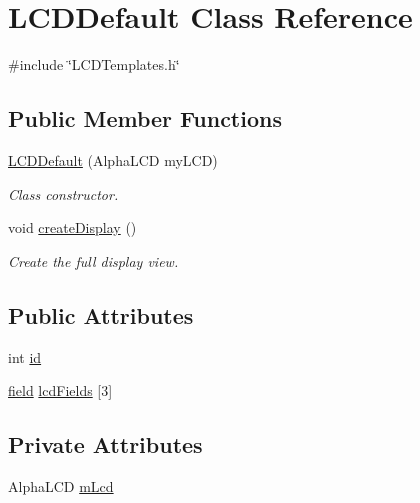 \hypertarget{class_l_c_d_default}{\section{L\-C\-D\-Default Class Reference}
\label{class_l_c_d_default}
}


{\ttfamily \#include \char`\"{}L\-C\-D\-Templates.\-h\char`\"{}}

\subsection*{Public Member Functions}
\begin{DoxyCompactItemize}
\item 
\hyperlink{class_l_c_d_default_ada0e3fb8c59e8db8075e8d1c4c29a9ad}{L\-C\-D\-Default} (Alpha\-L\-C\-D my\-L\-C\-D)
\begin{DoxyCompactList}\small\item\em Class constructor. \end{DoxyCompactList}\item 
void \hyperlink{class_l_c_d_default_ac6d60284f5b1e5ffa7fc0d7c1c52b8cb}{create\-Display} ()
\begin{DoxyCompactList}\small\item\em Create the full display view. \end{DoxyCompactList}\end{DoxyCompactItemize}
\subsection*{Public Attributes}
\begin{DoxyCompactItemize}
\item 
int \hyperlink{class_l_c_d_default_aa4b5f1f8f3e4778ab9dc50c6bcf1eac4}{id}
\item 
\hyperlink{_l_c_d_templates_8h_a20a49e010fbfc3a43959f12d92e01bb6}{field} \hyperlink{class_l_c_d_default_a3f016f453e030ad7392a36b11418fff8}{lcd\-Fields} \mbox{[}3\mbox{]}
\end{DoxyCompactItemize}
\subsection*{Private Attributes}
\begin{DoxyCompactItemize}
\item 
Alpha\-L\-C\-D \hyperlink{class_l_c_d_default_a9062ca1e44b8e0e5d360b00ce9218078}{m\-Lcd}
\end{DoxyCompactItemize}


